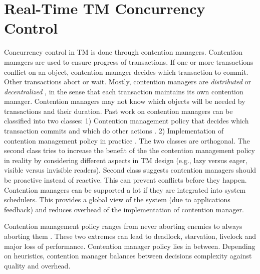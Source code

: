 \documentclass[12pt,english]{report}
\begin{document}
\section{\label{sec:contention manager}Real-Time TM Concurrency Control}
Concurrency control in TM is done through contention managers. Contention managers are used to ensure progress of transactions. If one or more transactions conflict on an object, contention manager
decides which transaction to commit. Other transactions abort or wait.
Mostly, contention managers are \textit{distributed} or \textit{decentralized}
\cite{Scherer:2005:ACM:1073814.1073861,scherer2004contention,Guerraoui:2005:TTT:1073814.1073863,Guerraoui:2006:TTT:1146381.1146429},
in the sense that each transaction maintains its own contention manager.
Contention managers may not know which objects will be needed by transactions
and their duration. Past work on contention managers can be classified
into two classes: 1) Contention management policy that decides which
transaction commits and which do other actions \cite{Guerraoui:2005:TTT:1073814.1073863,Guerraoui:2006:TTT:1146381.1146429,Scherer:2005:ACM:1073814.1073861,scherer2004contention,Spear:2009:CSC:1504176.1504199,springerlink:10.1007_11561927_23}.
2) Implementation of contention management policy in practice \cite{Spear:2009:CSC:1504176.1504199,Maldonado:2010:SST:1693453.1693465,Blake:2009:PTS:1669112.1669133,gottschlich2008extending,Scherer:2005:ACM:1073814.1073861,Dolev:2008:CSC:1400751.1400769}.
The two classes are orthogonal. The second class tries to increase
the benefit of the the contention management policy in reality by
considering different aspects in TM design (e.g., lazy versus eager,
visible versus invisible readers). Second class suggests contention
managers should be proactive instead of reactive. This can prevent
conflicts before they happen. Contention managers can be supported
a lot if they are integrated into system schedulers. This provides
a global view of the system (due to applications feedback) and reduces
overhead of the implementation of contention manager.

Contention management policy ranges from never aborting enemies to
always aborting them \cite{Scherer:2005:ACM:1073814.1073861,scherer2004contention}.
These two extremes can lead to deadlock, starvation, livelock and
major loss of performance. Contention manager policy lies in between.
Depending on heuristics, contention manager balances between decisions
complexity against quality and overhead.
\end{document}
